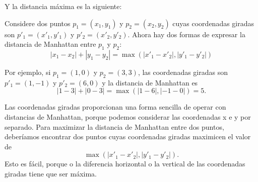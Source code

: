 \begin{center}
\end{center}
Y la distancia máxima es la siguiente:
\begin{center}
\end{center}

Considere dos puntos $p_1=(x_1,y_1)$ y $p_2=(x_2,y_2)$ cuyas coordenadas
giradas son $p'_1=(x'_1,y'_1)$ y $p'_2=(x'_2,y'_2)$.
Ahora hay dos formas de expresar la distancia de Manhattan
entre $p_1$ y $p_2$:
\[|x_1-x_2|+|y_1-y_2| = \max(|x'_1-x'_2|,|y'_1-y'_2|)\]

Por ejemplo, si $p_1=(1,0)$ y $p_2=(3,3)$,
las coordenadas giradas son $p'_1=(1,-1)$ y $p'_2=(6,0)$
y la distancia de Manhattan es
\[|1-3|+|0-3| = \max(|1-6|,|-1-0|) = 5.\]

Las coordenadas giradas proporcionan una forma sencilla
de operar con distancias de Manhattan, porque podemos
considerar las coordenadas x e y por separado.
Para maximizar la distancia de Manhattan entre dos puntos,
deberíamos encontrar dos puntos cuyas
coordenadas giradas maximicen el valor de
\[\max(|x'_1-x'_2|,|y'_1-y'_2|).\]
Esto es fácil, porque o la diferencia horizontal o la vertical
de las coordenadas giradas tiene que ser máxima.


